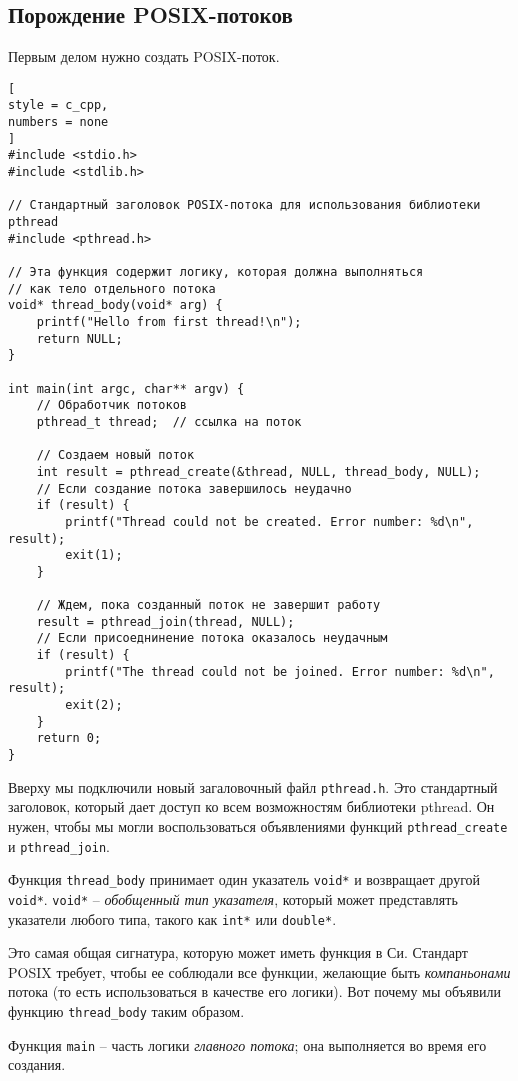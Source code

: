 \documentclass[%
	11pt,
	a4paper,
	utf8,
		]{article}
\begin{document}
\subsection{Порождение POSIX-потоков}

Первым делом нужно создать POSIX-поток.
\begin{lstlisting}[
style = c_cpp,
numbers = none
]
#include <stdio.h>
#include <stdlib.h>

// Стандартный заголовок POSIX-потока для использования библиотеки pthread
#include <pthread.h>

// Эта функция содержит логику, которая должна выполняться
// как тело отдельного потока
void* thread_body(void* arg) {
    printf("Hello from first thread!\n");
    return NULL;
}

int main(int argc, char** argv) {
    // Обработчик потоков
    pthread_t thread;  // ссылка на поток
    
    // Создаем новый поток
    int result = pthread_create(&thread, NULL, thread_body, NULL);
    // Если создание потока завершилось неудачно
    if (result) {
        printf("Thread could not be created. Error number: %d\n", result);
        exit(1);
    }
    
    // Ждем, пока созданный поток не завершит работу
    result = pthread_join(thread, NULL);
    // Если присоеднинение потока оказалось неудачным
    if (result) {
        printf("The thread could not be joined. Error number: %d\n", result);
        exit(2);
    }
    return 0;
}
\end{lstlisting}

Вверху мы подключили новый загаловочный файл \verb|pthread.h|. Это стандартный заголовок, который дает доступ ко всем возможностям библиотеки pthread. Он нужен, чтобы мы могли воспользоваться объявлениями функций \verb|pthread_create| и \verb|pthread_join|.

Функция \verb|thread_body| принимает один указатель \verb|void*| и возвращает другой \verb|void*|. \verb|void*| -- \emph{обобщенный тип указателя}, который может представлять указатели любого типа, такого как \verb|int*| или \verb|double*|.

Это самая общая сигнатура, которую может иметь функция в Си. Стандарт POSIX требует, чтобы ее соблюдали все функции, желающие быть \emph{компаньонами} потока (то есть использоваться в качестве его логики). Вот почему мы объявили функцию \verb|thread_body| таким образом.

Функция \verb|main| -- часть логики \emph{главного потока}; она выполняется во время его создания.
\end{document}
